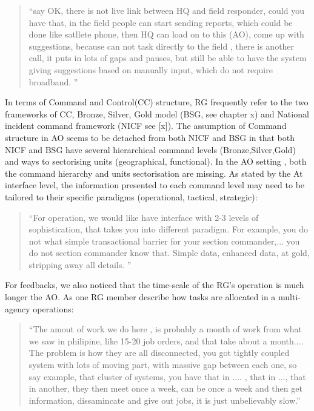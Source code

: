 \begin{quotation}
``say  OK, there is not live link between HQ and field responder, could you have that, in the field people can start sending reports, which could be done like satllete phone, then HQ can load on to this (AO), come up with suggestions, because can not task directly to the field , there is another call,  it puts in lots of gaps and pauses, but still be able to have the system giving suggestions based on manually input, which do not require broadband. ''
\end{quotation}


In terms of Command and Control(CC) structure, RG frequently refer to the two frameworks of CC,  Bronze, Silver, Gold model (BSG, see chapter x) and National incident command framework (NICF see [x]). The assumption of Command structure in AO seems to be detached from both NICF and BSG in that both NICF and BSG have several hierarchical command levels (Bronze,Silver,Gold) and ways to sectorising units (geographical, functional).  In the AO setting , both the command hierarchy and units sectorisation are missing. As stated by the At interface level, the information presented to each command level may need to be tailored to their specific paradigms (operational, tactical, strategic):

\begin{quotation}
``For operation, we would like have interface with 2-3 levels of sophistication, that takes you into different paradigm. For example, you do not what simple transactional barrier for your section commander,...  you do not section commander know that. Simple data, enhanced data, at gold, stripping away all details. ''
\end{quotation}

For feedbacks, we also noticed that the time-scale of the RG's operation is much longer the AO. As one RG member describe how tasks are allocated in a multi-agency operations: 

\begin{quotation}
``The amout of work we do here , is probably a month of work from what we saw in philipine, like 15-20 job orders, and that take about a month.... The problem is how they are all disconnected, you got tightly coupled system with lots of moving part, with massive gap between each one, so say example, that cluster of systems, you have that in .... , that in ..., that in another, they then meet once a week, can be once a week and then get information, dissamincate and give out jobs, it is just unbelievably slow.''
\end{quotation}

